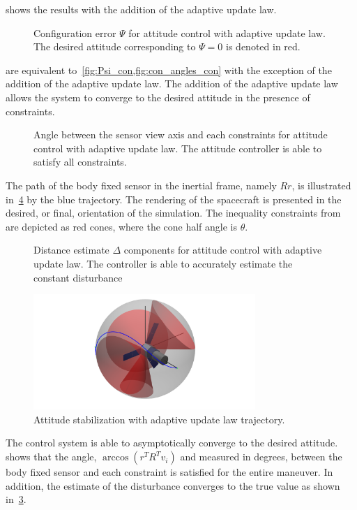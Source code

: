  shows the results with the addition of the adaptive update law.
\begin{figure}[htbp]
    \centering
    
    \caption{Configuration error \( \Psi \) for attitude control with adaptive update law.
    The desired attitude corresponding to \( \Psi = 0 \) is denoted in red.\label{fig:Psi_adapt}}
\end{figure}
 are equivalent to~\cref{fig:Psi_con,fig:con_angles_con} with the exception of the addition of the adaptive update law.
The addition of the adaptive update law allows the system to converge to the desired attitude in the presence of constraints.
\begin{figure}[htbp]
    \centering
    
    \caption{Angle between the sensor view axis and each constraints for attitude control with adaptive update law.
    The attitude controller is able to satisfy all constraints.\label{fig:con_angles}}
\end{figure}
The path of the body fixed sensor in the inertial frame, namely \( R r \), is illustrated in~\cref{fig:cad_adapt} by the blue trajectory.
The rendering of the spacecraft is presented in the desired, or final, orientation of the simulation.
The inequality constraints from~ are depicted as red cones, where the cone half angle is \( \theta \).
\begin{figure}[htbp]
    \centering
    
    \caption{Distance estimate \( \Delta \) components for attitude control with adaptive update law.
    The controller is able to accurately estimate the constant disturbance\label{fig:delta_adapt}}
\end{figure}

\begin{figure}[htbp]
  \centering 
    \includegraphics[trim={10cm 0 10cm 0},clip,width=0.75\textwidth]{figures/2016_IJCAS/cad_adapt}
    \caption{Attitude stabilization with adaptive update law trajectory.\label{fig:cad_adapt}}
\end{figure}
The control system is able to asymptotically converge to the desired attitude.
 shows that the angle, \( \arccos(r^T R^T v_i) \) and measured in degrees, between the body fixed sensor and each constraint is satisfied for the entire maneuver.
In addition, the estimate of the disturbance converges to the true value as shown in~\cref{fig:delta_adapt}.

